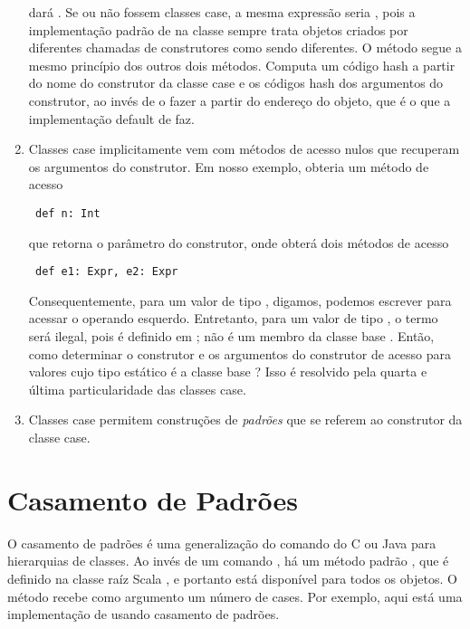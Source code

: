 \begin{enumerate}
dar\'{a} . Se  ou  n\~{a}o fossem classes case, a 
mesma express\~{a}o seria , pois a implementa\c{c}\~{a}o padr\~{a}o de  na 
classe  sempre trata objetos criados por diferentes chamadas de construtores 
como sendo diferentes. O m\'{e}todo  segue a mesmo princ\'{i}pio dos 
outros dois m\'{e}todos. Computa um c\'{o}digo hash a partir do nome do construtor da classe case
e os c\'{o}digos hash dos argumentos do construtor, ao inv\'{e}s de o fazer a partir do endere\c{c}o 
do objeto, que \'{e} o que a implementa\c{c}\~{a}o default de  faz.
\item
Classes case implicitamente vem com m\'{e}todos de acesso nulos que recuperam os argumentos 
do construtor. Em nosso exemplo,  obteria um m\'{e}todo de acesso  
 \begin{lstlisting}
 def n: Int
 \end{lstlisting}

que retorna o par\^{a}metro  do construtor, onde  obter\'{a} dois m\'{e}todos de acesso
 \begin{lstlisting}
 def e1: Expr, e2: Expr
 \end{lstlisting}

Consequentemente, para um valor  de tipo , digamos, 
podemos escrever  para acessar o operando esquerdo. Entretanto, 
para um valor  de tipo , o termo  ser\'{a} ilegal,
pois  \'{e} definido em ; n\~{a}o \'{e} um membro da classe base
.
Ent\~{a}o, como determinar o construtor e os argumentos do construtor de acesso
para valores cujo tipo est\'{a}tico \'{e} a classe base ? Isso \'{e} resolvido
pela quarta e \'{u}ltima particularidade das classes case.
\item
Classes case permitem constru\c{c}\~{o}es de {\em padr\~{o}es} que se referem ao construtor 
da classe case.
 \end{enumerate}

\section{Casamento de Padr\~{o}es}

O casamento de padr\~{o}es \'{e} uma generaliza\c{c}\~{a}o do comando  do C ou
Java para hierarquias de classes. Ao inv\'{e}s de um comando , h\'{a} um 
m\'{e}todo padr\~{a}o , que \'{e} definido na classe ra\'{i}z Scala , e 
portanto est\'{a} dispon\'{i}vel para todos os objetos. O m\'{e}todo  recebe como 
argumento um n\'{u}mero de cases. Por exemplo, aqui est\'{a} uma implementa\c{c}\~{a}o de 
usando casamento de padr\~{o}es.

